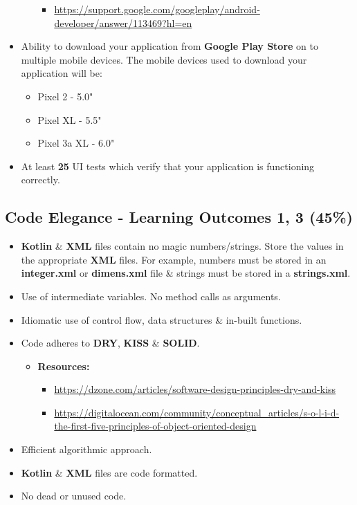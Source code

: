 \documentclass{article}
\begin{document}
\begin{itemize}
\begin{itemize}
\begin{itemize}
			            \item \footnotesize\href{https://support.google.com/googleplay/android-developer/answer/113469?hl=en}{https://support.google.com/googleplay/android-developer/answer/113469?hl=en}
		            \end{itemize}
	      \end{itemize}
	\item Ability to download your application from \textbf{Google Play Store} on to multiple mobile devices. The mobile devices used to download your application will be:
	      \begin{itemize}
		      \item Pixel 2 - 5.0"
		      \item Pixel XL - 5.5"
		      \item Pixel 3a XL - 6.0"
	      \end{itemize}
	\item At least \textbf{25} UI tests which verify that your application is functioning correctly.
\end{itemize}

\subsection*{Code Elegance - Learning Outcomes 1, 3 (45\%)}
\begin{itemize}
	\item \textbf{Kotlin} \& \textbf{XML} files contain no magic numbers/strings. Store the values in the appropriate \textbf{XML} files. For example, numbers must be stored in an \textbf{integer.xml} or \textbf{dimens.xml} file \& strings must be stored in a \textbf{strings.xml}.
	\item Use of intermediate variables. No method calls as arguments.
	\item Idiomatic use of control flow, data structures \& in-built functions.
	\item Code adheres to \textbf{DRY}, \textbf{KISS} \& \textbf{SOLID}.
	\begin{itemize}
		\item \textbf{Resources:}
		\begin{itemize}
			\item \footnotesize\href{https://dzone.com/articles/software-design-principles-dry-and-kiss}{https://dzone.com/articles/software-design-principles-dry-and-kiss}
			\item \footnotesize\href{https://digitalocean.com/community/conceptual\_articles/s-o-l-i-d-the-first-five-principles-of-object-oriented-design}{https://digitalocean.com/community/conceptual\_articles/s-o-l-i-d-the-first-five-principles-of-object-oriented-design}
		\end{itemize}
	\end{itemize}
	\item Efficient algorithmic approach.
	\item \textbf{Kotlin} \& \textbf{XML} files are code formatted.
	\item No dead or unused code.
\end{itemize}
\end{document}

